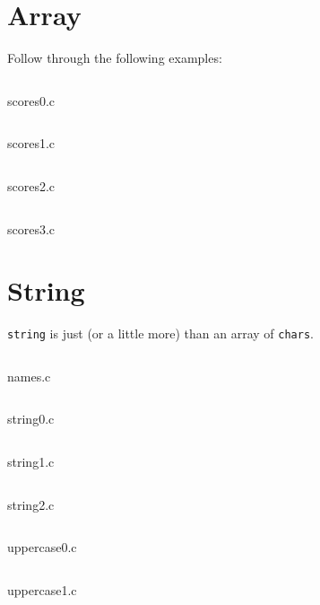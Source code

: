 \section{Array}
Follow through the following examples:
\begin{code}[htbp!]
    \inputminted[linenos]{c}{codes/src2/scores0.c}
    \caption{scores0.c}
\end{code}

\begin{code}[htbp!]
    \inputminted[linenos]{c}{codes/src2/scores1.c}
    \caption{scores1.c}
\end{code}

\begin{code}[htbp!]
    \inputminted[linenos]{c}{codes/src2/scores2.c}
    \caption{scores2.c}
\end{code}

\begin{code}[htbp!]
    \inputminted[linenos]{c}{codes/src2/scores3.c}
    \caption{scores3.c}
\end{code}

\section{String}
\texttt{string} is just (or a little more) than an array of \texttt{chars}.

\begin{code}[!htbp]
    \inputminted[linenos]{c}{codes/src2/names.c}
    \caption{names.c}
\end{code}

\begin{code}[!htbp]
    \inputminted[linenos]{c}{codes/src2/string0.c}
    \caption{string0.c}
\end{code}

\begin{code}[!htbp]
    \inputminted[linenos]{c}{codes/src2/string1.c}
    \caption{string1.c}
\end{code}

\begin{code}[!htbp]
    \inputminted[linenos]{c}{codes/src2/string2.c}
    \caption{string2.c}
\end{code}

\begin{code}[!htbp]
    \inputminted[linenos]{c}{codes/src2/uppercase0.c}
    \caption{uppercase0.c}
\end{code}

\begin{code}[!htbp]
    \inputminted[linenos]{c}{codes/src2/uppercase1.c}
    \caption{uppercase1.c}
\end{code}

